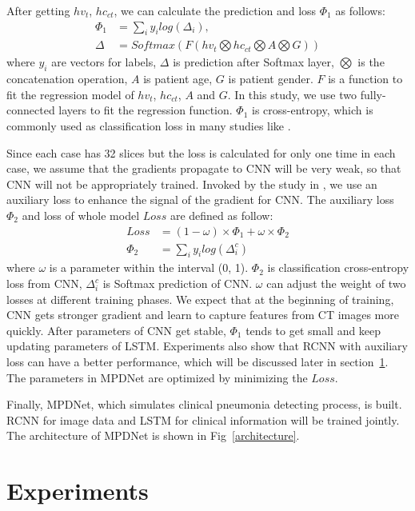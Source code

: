 \documentclass[journal]{IEEEtran}
\begin{document}
After getting $hv_t$, $hc_{ct}$, we can calculate the prediction and loss $\Phi_1$ as follows:
\begin{align*}\label{classifyandloss1}
    \Phi_1 &= \sum_i{y_i log(\Delta_i)}, \\
    \Delta &= Softmax(F(hv_t \bigotimes hc_{ct} \bigotimes A \bigotimes G))
\end{align*}
where $y_i$ are vectors for labels, $\Delta$ is prediction after Softmax layer, $\bigotimes$ is the concatenation operation, $A$ is patient age, $G$ is patient gender. $F$ is a function to fit the regression model of $hv_t$, $hc_{ct}$, $A$ and $G$. In this study, we use two fully-connected layers to fit the regression function. $\Phi_1$ is cross-entropy, which is commonly used as classification loss in many studies like \cite{Zreik2018A}.

Since each case has 32 slices but the loss is calculated for only one time in each case, we assume that the gradients propagate to CNN will be very weak, so that CNN will not be appropriately trained. Invoked by the study in \cite{szegedy2016rethinking}, we use an auxiliary loss to enhance the signal of the gradient for CNN.
The auxiliary loss $\Phi_2$ and loss of whole model $Loss$ are defined as follow: 
\begin{align*}
Loss &=  (1 - \omega) \times \Phi_1 +  \omega \times \Phi_2 \\
\Phi_2 &= \sum_i{y_i log(\Delta^c_i)}
\end{align*}
where $\omega$ is a parameter within the interval (0, 1). $\Phi_2$ is classification cross-entropy loss from CNN, $\Delta^c_i$ is Softmax prediction of CNN. $\omega$ can adjust the weight of two losses at different training phases.
We expect that at the beginning of training, CNN gets stronger gradient and learn to capture features from CT images more quickly. After parameters of CNN get stable, $\Phi_1$ tends to get small and keep updating parameters of LSTM. Experiments also show that RCNN with auxiliary loss can have a better performance, which will be discussed later in section~\ref{experiments}. The parameters in MPDNet are optimized by minimizing the $Loss$.

Finally, MPDNet, which simulates clinical pneumonia detecting process, is built. RCNN for image data and LSTM for clinical information will be trained jointly. The architecture of MPDNet is shown in Fig~\ref{architecture}.

\section{Experiments}
\label{experiments}
\end{document}
